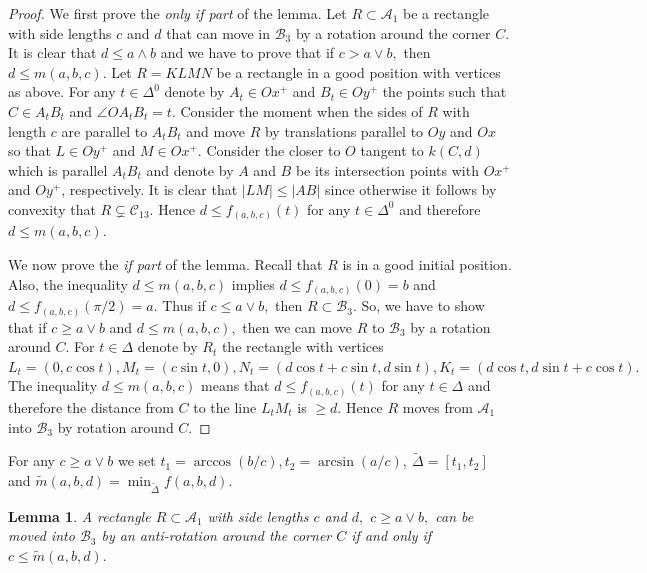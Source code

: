\documentclass[12pt]{amsart}
\newtheorem{lem}[thm]{Lemma}
\def\A{\mathcal A}
\def\B{\mathcal B}
\def\C{\mathcal C}
\def\DD{\Delta}
\def\w{\wedge}
\def\ss{\subset}
\begin{document}
\begin{proof} We first prove the \emph{only if part} of the
lemma.
Let $R\ss \A_1$ be a rectangle with side lengths $c$
and $d$ that can move in $\B_3$ by a rotation around
the corner $C$. It is clear that $d\le a\w b $ and we have to
prove that if $c>a\vee b ,$ then $d\le m(a,b,c).$
Let $R=KLMN$ be a rectangle in a good position with vertices as
above. For any $t\in\DD^0$ denote by $A_t\in Ox^+$ and $B_t\in
Oy^+$ the points such that $C\in A_tB_t$ and $\angle OA_tB_t=t.$
Consider the moment when the sides of $R$ with length $c$ are
parallel to $A_tB_t$ and move  $R$ by translations parallel to
$Oy$ and  $Ox$ so that $L\in Oy^+$ and $M\in Ox^+$. Consider the
closer to $O$ tangent  to $k(C,d)$ which is parallel $A_tB_t$ and
denote by $A$ and $B$ be its intersection points with $Ox^+$ and
$Oy^+$, respectively. It is clear that $|LM|\leq |AB|$ since
otherwise it follows by convexity that $R\subsetneq \C_{13}$.
Hence $d\leq f_{(a,b,c)}(t)$ for any $t\in\DD^0$ and therefore
$d\le m(a,b,c).$

We now prove the \emph{if part} of the lemma.
Recall that $R$ is
in a good initial position. Also, the inequality  $d\le m(a,b,c)$
implies $d\le f_{(a,b,c)}(0)=b$ and $d\le f_{(a,b,c)}(\pi/2)=a$.
Thus if $c\le a\vee b ,$ then $R\ss\B_3$. So, we have to show that
if $c\ge a\vee b$ and $d\le m(a,b,c),$ then we can move $R$ to
$\B_3$ by a rotation around $C$.
For $t\in \DD$ denote by $R_t$ the rectangle with vertices
$L_t=(0,c\cos t), M_t=(c\sin t,0), N_t=(d\cos t+c\sin t, d\sin t),
K_t=(d\cos t, d\sin t+c\cos t).$ The inequality $d\le m(a,b,c)$
means that $d\le f_{(a,b,c)}(t)$ for any $t\in\DD$ and therefore
the distance from $C$ to the line $L_tM_t$ is $\ge d$. Hence $R$
moves from $\A_1$ into $\B_3$ by rotation around $C$.
\end{proof}

For any $c\ge a\vee b$ we set $t_1=\arccos(b/c), t_2=\arcsin(a/c)
, \ \widetilde{\DD}=[t_1,t_2] $ and $\widetilde{m}(a,b,d)=
\min_{\widetilde{\DD}}f(a,b,d) .$

\begin{lem}\label{l3} A rectangle $R\ss \A_1$ with side lengths
$c$ and $d,$ $c\ge a\vee b,$ can be moved into $\B_3$ by an
anti-rotation around the corner $C$ if and only if $c\le
\widetilde{m}(a,b,d).$
\end{lem}
\end{document}
